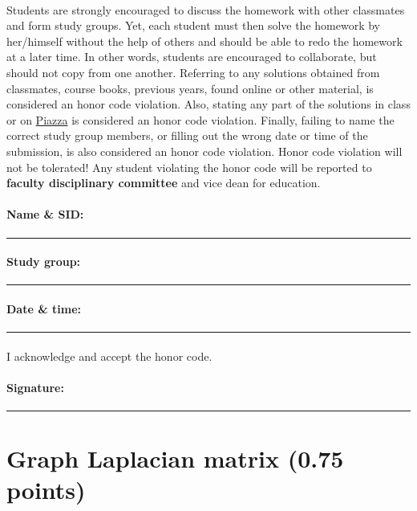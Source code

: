 \documentclass[11pt,a4paper]{article}
\newcommand{\totals}[1]{({\color{magenta}#1 points})}
\begin{document}
\paragraph{} Students are strongly encouraged to discuss the homework with other classmates and form study groups. Yet, each student must then solve the homework by her/himself without the help of others and should be able to redo the homework at a later time. In other words, students are encouraged to collaborate, but should not copy from one another. Referring to any solutions obtained from classmates, course books, previous years, found online or other material, is considered an honor code violation. Also, stating any part of the solutions in class or on \href{https://piazza.com/class/kkn1oz577n2sq}{Piazza} is considered an honor code violation. Finally, failing to name the correct study group members, or filling out the wrong date or time of the submission, is also considered an honor code violation. Honor code violation will not be tolerated! Any student violating the honor code will be reported to {\bf\color{LimeGreen} faculty disciplinary committee} and vice dean for education.

\vspace*{0.15in}
\paragraph{Name \& SID:} \rule{4.5in}{0.5pt}
\paragraph{Study group:} \rule{4.5in}{0.5pt}
\paragraph{Date \& time:} \rule{2.5in}{0.5pt}
\paragraph{} I acknowledge and accept the honor code.
\paragraph{Signature:} \rule{2.5in}{0.5pt}

\pagebreak

\section{Graph Laplacian matrix \totals{0.75}}
\end{document}
